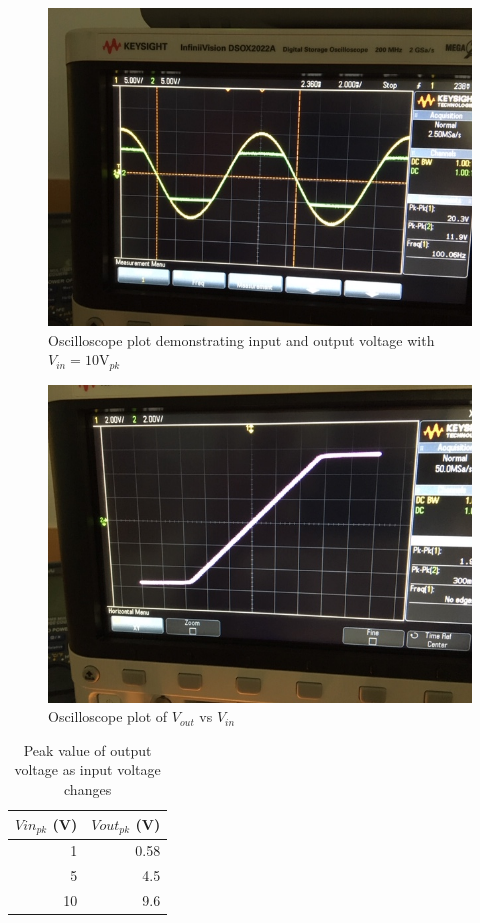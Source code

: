 \documentclass{article}
\begin{document}
\begin{figure}[H]
  \centering
  \includegraphics[width=\textwidth]{image/Part3/IMG_3703.JPG}
  \caption{Oscilloscope plot demonstrating input and output voltage with $V_{in}=10\text{V}_{pk}$}
\end{figure}
\begin{figure}[H]
  \centering
  \includegraphics[width=\textwidth]{image/Part3/IMG_3704.JPG}
  \caption{Oscilloscope plot of $V_{out}$ vs $V_{in}$}
\end{figure}

\begin{table}[H]
  \centering
    \begin{tabular}{rr}
      \toprule
    \multicolumn{1}{l}{$Vin_{pk}$ (V)} & \multicolumn{1}{l}{$Vout_{pk}$ (V)} \\
    \midrule
    1     & 0.58 \\
    5     & 4.5 \\
    10    & 9.6 \\
      \bottomrule
  \end{tabular}%
    \caption{Peak value of output voltage as input voltage changes}
\end{table}%
\end{document}
